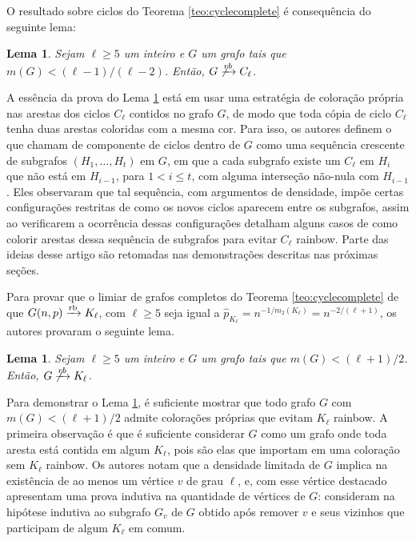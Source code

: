 \documentclass[12pt,a4paper]{book}
\def\rbarrow{\xrightarrow[]{\raisebox{0.0mm}[0mm]{$\scriptstyle \rm rb$}}}
\newtheorem{lema}      [teorema] {Lema}
\begin{document}
    O resultado sobre ciclos do Teorema \ref{teo:cyclecomplete} é consequência do seguinte lema:
    
\begin{lema}\label{lema:rbciclos}\cite{barros2021anti}
         Sejam $\ell \geq 5$ um inteiro e $G$ um grafo tais que
         $m(G) < (\ell-1)/(\ell-2)$. 
         Então, $G \not\xrightarrow[]{rb} C_\ell$.
\end{lema}
    
A essência da prova do Lema \ref{lema:rbciclos} está em usar uma estratégia de coloração própria nas arestas dos ciclos $C_\ell$ contidos no grafo $G$, de modo que toda cópia de ciclo $C_\ell$ tenha duas arestas coloridas com a mesma cor.
%
Para isso, os autores definem o que chamam de componente de ciclos dentro de $G$ como uma sequência crescente de subgrafos $(H_1, \ldots, H_t)$ em $G$, em que a cada subgrafo existe um $C_\ell$ em $H_{i}$ que não está em $H_{i-1}$, para $1 < i \leq t$, com alguma interseção não-nula com $H_{i-1}$.
%
Eles observaram que tal sequência, com argumentos de densidade, impõe certas configurações restritas de como os novos ciclos aparecem entre os subgrafos, assim ao verificarem a ocorrência dessas configurações detalham alguns casos de como colorir arestas dessa sequência de subgrafos para evitar $C_\ell$ rainbow.
     Parte das ideias desse artigo são retomadas nas demonstrações descritas nas próximas seções.
 
 
   Para provar que o limiar de grafos completos do Teorema \ref{teo:cyclecomplete} de que $G(n,p) \rbarrow K_\ell$, com $\ell \geq 5$ seja igual a $\hat{p}_{K_\ell} = n^{-1/m_2(K_\ell)} = n^{- 2/(\ell+1)}$, os autores provaram o seguinte lema.
   
   \begin{lema}\label{lema:rbcomplete}\cite{kohayakawa2019anti}
         Sejam $\ell \geq 5$ um inteiro e $G$ um grafo tais que 
         $m(G) < (\ell+1)/2$.
         Então, $G \not\xrightarrow[]{rb} K_\ell$.
    \end{lema}
    Para demonstrar o Lema \ref{lema:rbcomplete}, é suficiente mostrar que todo grafo $G$ com $m(G) < (\ell+1)/2$  admite colorações próprias que evitam $K_\ell$ rainbow. 
    A primeira observação é que é suficiente considerar $G$ como um grafo onde toda aresta está contida em algum $K_\ell$, pois são elas que importam em uma coloração sem $K_\ell$ rainbow. 
    Os autores notam que a densidade limitada de $G$ implica na existência de ao menos um vértice $v$ de grau $\ell$, e, com esse vértice destacado apresentam uma prova indutiva na quantidade de vértices de $G$: consideram na hipótese indutiva ao subgrafo $G_v$ de $G$ obtido após remover $v$ e seus vizinhos que participam de algum $K_\ell$ em comum.
    
\end{document}
